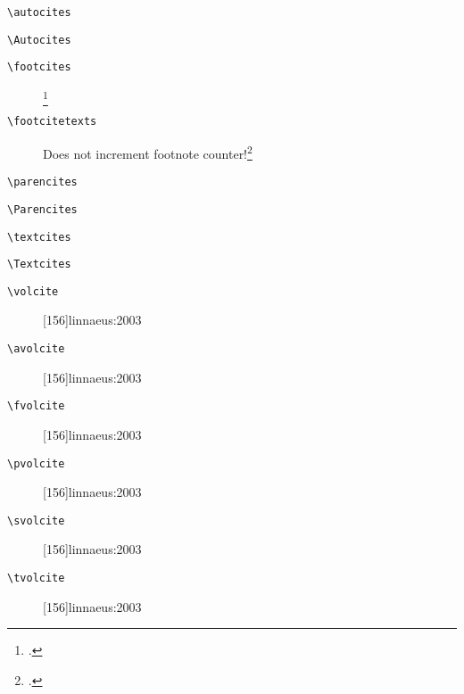 \documentclass[a4paper,12pt]{scrartcl}
\newcommand*{\Befehl}[1]{\texttt{\textbackslash#1}}
\begin{document}
\begin{description}
    \item[\footnotesize\Befehl{autocites}] \autocites[68]{auler:hiller:2011}[48]{auler:hiller:2015a}[159--187]{auler:hiller:2015}[40--41]{auler:hiller:2016}[15--23]{tacitus:1981}[19]{de:neck:yoder:1978}
    \item[\footnotesize\Befehl{Autocites}] \Autocites[68]{auler:hiller:2011}[48]{auler:hiller:2015a}[159--187]{auler:hiller:2015}[40--41]{auler:hiller:2016}[15--23]{tacitus:1981}[19]{de:neck:yoder:1978}
	\item[\footnotesize\Befehl{footcites}] \footcites[68]{auler:hiller:2011}[48]{auler:hiller:2015a}[159--187]{auler:hiller:2015}[40--41]{auler:hiller:2016}[15--23]{tacitus:1981}[19]{de:neck:yoder:1978}
	\item[\footnotesize\Befehl{footcitetexts}] Does not increment footnote counter!\footcitetexts[68]{auler:hiller:2011}[48]{auler:hiller:2015a}[159--187]{auler:hiller:2015}[40--41]{auler:hiller:2016}[15--23]{tacitus:1981}[19]{de:neck:yoder:1978}
    \item[\footnotesize\Befehl{parencites}] \parencites[68]{auler:hiller:2011}[48]{auler:hiller:2015a}[159--187]{auler:hiller:2015}[40--41]{auler:hiller:2016}[15--23]{tacitus:1981}[19]{de:neck:yoder:1978}
    \item[\footnotesize\Befehl{Parencites}] \Parencites[68]{auler:hiller:2011}[48]{auler:hiller:2015a}[159--187]{auler:hiller:2015}[40--41]{auler:hiller:2016}[15--23]{tacitus:1981}[19]{de:neck:yoder:1978}
    \item[\footnotesize\Befehl{textcites}] \textcites[68]{auler:hiller:2011}[48]{auler:hiller:2015a}[159--187]{auler:hiller:2015}[40--41]{auler:hiller:2016}[15--23]{tacitus:1981}[19]{de:neck:yoder:1978}
    \item[\footnotesize\Befehl{Textcites}] \Textcites[68]{auler:hiller:2011}[48]{auler:hiller:2015a}[159--187]{auler:hiller:2015}[40--41]{auler:hiller:2016}[15--23]{tacitus:1981}[19]{de:neck:yoder:1978}
	\item[\footnotesize\Befehl{volcite}] [156]{linnaeus:2003}
	\item[\footnotesize\Befehl{avolcite}] [156]{linnaeus:2003}
	\item[\footnotesize\Befehl{fvolcite}] [156]{linnaeus:2003}
	\item[\footnotesize\Befehl{pvolcite}] [156]{linnaeus:2003}
	\item[\footnotesize\Befehl{svolcite}] [156]{linnaeus:2003}
	\item[\footnotesize\Befehl{tvolcite}] [156]{linnaeus:2003}

\end{description}
\end{document}
